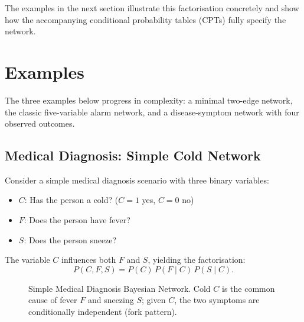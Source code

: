 The examples in the next section illustrate this factorisation concretely
and show how the accompanying conditional probability tables (CPTs) fully
specify the network.
\section{Examples}\label{sec:examples}

The three examples below progress in complexity: a minimal two-edge network,
the classic five-variable alarm network, and a disease-symptom network with
four observed outcomes.

\subsection{Medical Diagnosis: Simple Cold Network}

Consider a simple medical diagnosis scenario with three binary variables:
\begin{itemize}
    \item $C$: Has the person a cold? ($C=1$ yes, $C=0$ no)
    \item $F$: Does the person have fever?
    \item $S$: Does the person sneeze?
\end{itemize}

The variable $C$ influences both $F$ and $S$, yielding the factorisation:
\begin{equation}
    P(C, F, S) = P(C)\,P(F \mid C)\,P(S \mid C).
\end{equation}

\begin{figure}[htbp]
\centering
{}
\caption{Simple Medical Diagnosis Bayesian Network. Cold $C$ is the common
         cause of fever $F$ and sneezing $S$; given $C$, the two symptoms
         are conditionally independent (fork pattern).}
\label{fig:simple_medical_bn}
\end{figure}

